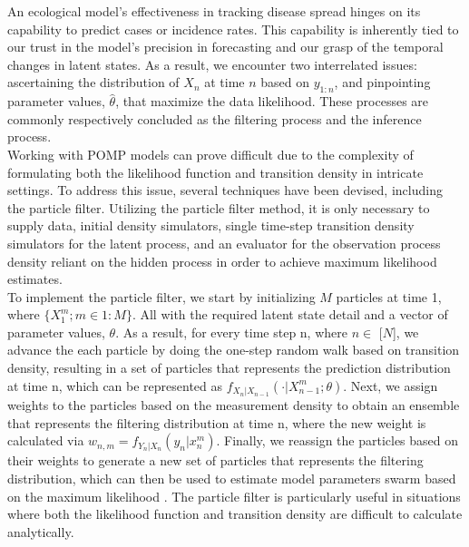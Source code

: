 \documentclass[12pt]{article}
\begin{document}
An ecological model's effectiveness in tracking disease spread hinges on its capability to predict cases or incidence rates. This capability is inherently tied to our trust in the model's precision in forecasting and our grasp of the temporal changes in latent states. As a result, we encounter two interrelated issues: ascertaining the distribution of $X_{n}$ at time $n$ based on $y_{1:n}$, and pinpointing parameter values, $\hat{\theta}$, that maximize the data likelihood. These processes are commonly respectively concluded as the filtering process and the inference process.\\

Working with POMP models can prove difficult due to the complexity of formulating both the likelihood function and transition density in intricate settings. To address this issue, several techniques have been devised, including the particle filter. Utilizing the particle filter method, it is only necessary to supply data, initial density simulators, single time-step transition density simulators for the latent process, and an evaluator for the observation process density reliant on the hidden process in order to achieve maximum likelihood estimates.\\

To implement the particle filter, we start by initializing $M$ particles at time 1, where $\{ X_1^m; m \in 1:M \}$. All with the required latent state detail and a vector of parameter values, $\theta$. As a result, for every time step n, where $n \in $ [$N$], we advance the each particle by doing the one-step random walk based on transition density, resulting in a set of particles that represents the prediction distribution at time n, which can be represented as $f_{X_n|X_{n-1}}(\cdot | X_{n-1}^m; \theta)$. Next, we assign weights to the particles based on the measurement density to obtain an ensemble that represents the filtering distribution at time n, where the new weight is calculated via $w_{n,m} = f_{Y_n|X_n}(y_n | x_n^m)$. Finally, we reassign the particles based on their weights to generate a new set of particles that represents the filtering distribution, which can then be used to estimate model parameters swarm based on the maximum likelihood \cite{5}. The particle filter is particularly useful in situations where both the likelihood function and transition density are difficult to calculate analytically.\\
\end{document}
